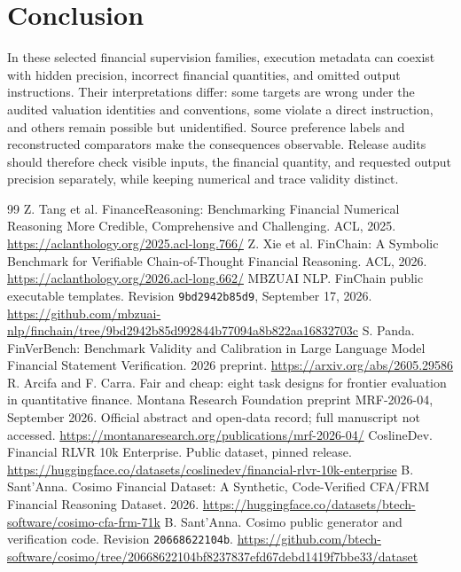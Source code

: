 \section{Conclusion}
In these selected financial supervision families, execution metadata can coexist with hidden precision, incorrect financial quantities, and omitted output instructions. Their interpretations differ: some
targets are wrong under the audited valuation identities and conventions, some violate a direct instruction, and others remain possible but unidentified. Source preference labels and reconstructed comparators make the
consequences observable. Release audits should therefore check visible inputs, the financial quantity, and requested output precision separately, while keeping numerical and trace validity distinct.

\clearpage
\begin{thebibliography}{99}
 Z. Tang et al. FinanceReasoning: Benchmarking Financial Numerical Reasoning More Credible, Comprehensive and Challenging. ACL, 2025. \url{https://aclanthology.org/2025.acl-long.766/}
 Z. Xie et al. FinChain: A Symbolic Benchmark for Verifiable Chain-of-Thought Financial Reasoning. ACL, 2026. \url{https://aclanthology.org/2026.acl-long.662/}
 MBZUAI NLP. FinChain public executable templates. Revision \texttt{9bd2942b85d9}, September 17, 2026. \url{https://github.com/mbzuai-nlp/finchain/tree/9bd2942b85d992844b77094a8b822aa16832703c}
 S. Panda. FinVerBench: Benchmark Validity and Calibration in Large Language Model Financial Statement Verification. 2026 preprint. \url{https://arxiv.org/abs/2605.29586}
 R. Arcifa and F. Carra. Fair and cheap: eight task designs for frontier evaluation in quantitative finance. Montana Research Foundation preprint MRF-2026-04, September 2026. Official abstract and open-data record; full manuscript not accessed. \url{https://montanaresearch.org/publications/mrf-2026-04/}
 CoslineDev. Financial RLVR 10k Enterprise. Public dataset, pinned release. \url{https://huggingface.co/datasets/coslinedev/financial-rlvr-10k-enterprise}
 B. Sant'Anna. Cosimo Financial Dataset: A Synthetic, Code-Verified CFA/FRM Financial Reasoning Dataset. 2026. \url{https://huggingface.co/datasets/btech-software/cosimo-cfa-frm-71k}
 B. Sant'Anna. Cosimo public generator and verification code. Revision \texttt{20668622104b}. \url{https://github.com/btech-software/cosimo/tree/20668622104bf8237837efd67debd1419f7bbe33/dataset}

\end{thebibliography}
